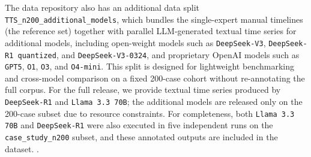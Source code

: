 The data repository also has an additional data split \texttt{TTS\_n200\_additional\_models}, which bundles the single-expert manual timelines (the reference set) together with parallel LLM-generated textual time series for additional models, including open-weight models such as \texttt{DeepSeek-V3}, \texttt{DeepSeek-R1 quantized}, and \texttt{DeepSeek-V3-0324}, and proprietary OpenAI models such as \texttt{GPT5}, \texttt{O1}, \texttt{O3}, and \texttt{O4-mini}.
This split is designed for lightweight benchmarking and cross-model comparison on a fixed 200-case cohort without re-annotating the full corpus.
For the full  release, we provide textual time series produced by \texttt{DeepSeek-R1} and \texttt{Llama 3.3 70B}; the additional models are released only on the 200-case subset due to resource constraints.
For completeness, both \texttt{Llama 3.3 70B} and \texttt{DeepSeek-R1} were also executed in five independent runs on the \texttt{case\_study\_n200} subset, and these annotated outputs are included in the dataset.
.

